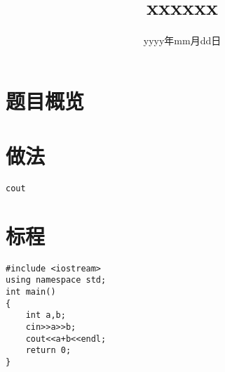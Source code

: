 \documentclass{ctsol}
\title{xxxxxx}
\date{yyyy年mm月dd日}
\begin{document}
\maketitle
{}

\section*{题目概览}
\solutiontab

\makesolution
\section*{做法}
\verb|cout|

\section*{标程}
\begin{lstlisting}
#include <iostream>
using namespace std;
int main()
{
    int a,b;
    cin>>a>>b;
    cout<<a+b<<endl;
    return 0;
}
\end{lstlisting}
\end{document}
